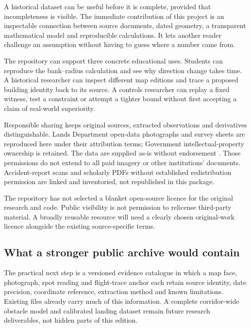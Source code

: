 \label{part:8}
A historical dataset can be useful before it is complete, provided that incompleteness is visible. The immediate contribution of this project is an inspectable connection between source documents, dated geometry, a transparent mathematical model and reproducible calculations. It lets another reader challenge an assumption without having to guess where a number came from.


The repository can support three concrete educational uses. Students can reproduce the bank--radius calculation and see why direction change takes time. A historical researcher can inspect different map editions and trace a proposed building identity back to its source. A controls researcher can replay a fixed witness, test a constraint or attempt a tighter bound without first accepting a claim of real-world superiority.

Responsible sharing keeps original sources, extracted observations and derivatives distinguishable. Lands Department open-data photographs and survey sheets are reproduced here under their attribution terms; Government intellectual-property ownership is retained. The data are supplied as-is without endorsement \citep{dataterms,csditerms}. Those permissions do not extend to all paid imagery or other institutions' documents. Accident-report scans and scholarly PDFs without established redistribution permission are linked and inventoried, not republished in this package.

The repository has not selected a blanket open-source licence for the original research and code. Public visibility is not permission to relicense third-party material. A broadly reusable resource will need a clearly chosen original-work licence alongside the existing source-specific terms.
\par\medskip
\subsection*{What a stronger public archive would contain}
The practical next step is a versioned evidence catalogue in which a map face, photograph, spot reading and flight-trace anchor each retain source identity, date precision, coordinate reference, extraction method and known limitations. Existing files already carry much of this information. A complete corridor-wide obstacle model and calibrated landing dataset remain future research deliverables, not hidden parts of this edition.

